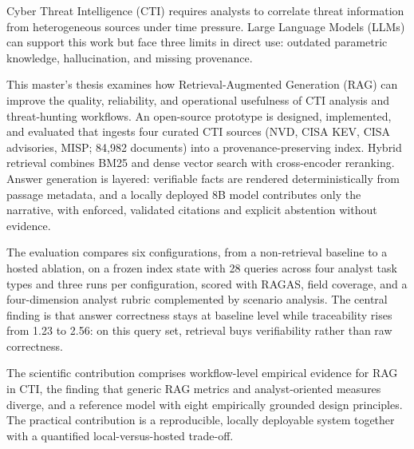 Cyber Threat Intelligence (CTI) requires analysts to correlate threat
information from heterogeneous sources under time pressure. Large
Language Models (LLMs) can support this work but face three limits in
direct use: outdated parametric knowledge, hallucination, and missing
provenance.

This master's thesis examines how Retrieval-Augmented Generation (RAG)
can improve the quality, reliability, and operational usefulness of
CTI analysis and threat-hunting workflows. An open-source prototype is
designed, implemented, and evaluated that ingests four curated CTI
sources (NVD, CISA KEV, CISA advisories, MISP; 84,982 documents) into
a provenance-preserving index. Hybrid retrieval combines BM25 and
dense vector search with cross-encoder reranking. Answer generation is
layered: verifiable facts are rendered deterministically from passage
metadata, and a locally deployed 8B model contributes only the
narrative, with enforced, validated citations and explicit abstention
without evidence.

The evaluation compares six configurations, from a non-retrieval
baseline to a hosted ablation, on a frozen index state with 28 queries
across four analyst task types and three runs per configuration,
scored with RAGAS, field coverage, and a four-dimension analyst rubric
complemented by scenario analysis. The central finding is that answer
correctness stays at baseline level while traceability rises from 1.23
to 2.56: on this query set, retrieval buys verifiability rather than
raw correctness.

The scientific contribution comprises workflow-level empirical
evidence for RAG in CTI, the finding that generic RAG metrics and
analyst-oriented measures diverge, and a reference model with eight
empirically grounded design principles. The practical contribution is
a reproducible, locally deployable system together with a quantified
local-versus-hosted trade-off.

